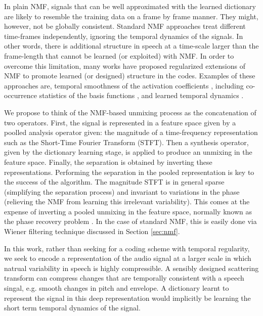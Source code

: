 In plain NMF, signals that can be well approximated with the learned dictionary are
likely to resemble the training data on a frame by frame manner. They might, however, 
not be globally consistent. Standard NMF approaches treat different time-frames independently, ignoring the 
temporal dynamics of the signals. In other words, there is additional structure in speech at a time-scale larger than
the frame-length that cannot be learned (or exploited) with NMF. In order to overcome this limitation,  
many works have proposed regularized extensions of NMF to promote learned (or designed) structure in the codes. Examples of these approaches are, temporal smoothness of the activation coefficients \cite{fevotte2011majorization}, including  co-occurrence statistics of the basis functions \cite{WilsonRSD08}, and learned temporal dynamics \cite{MysoreS11,HanMP12,icassp13a,mohammadiha2013nonnegative}.


We propose to think of the NMF-based unmixing process as the concatenation of two operators.
First, the signal is represented in a feature space given by a poolled analysis operator given: the magnitude of a time-frequency representation such
as the Short-Time Fourier Transform (STFT). Then a synthesis operator, given by the dictionary learning stage, is applied to produce an unmixing in the feature space.
Finally, the separation is obtained by inverting these representations. Performing the separation in the pooled representation is key to the success of the algorithm. The magnitude STFT is in general sparse (simplifying the separation process) and invariant to variations in the phase (relieving the NMF from
learning this irrelevant variability). This comes at the expense of inverting a pooled unmixing in the feature space, normally known as the
phase recovery problem \cite{XX}. In the case of standard NMF, this is easily done via Wiener filtering technique discussed in Section \ref{sec:nmf}.

In this work, rather than seeking for a coding scheme with temporal regularity, we seek to encode a representation of the audio signal at a larger scale in which
natrual variability in speech is highly compressible. A sensibly designed scattering transform can compress changes that are temporally consistent with a speech singal, e.g. smooth changes in pitch and envelope. A dictionary learnt to represent the signal in this deep representation would implicitly be learning the short term temporal dynamics of the signal.

